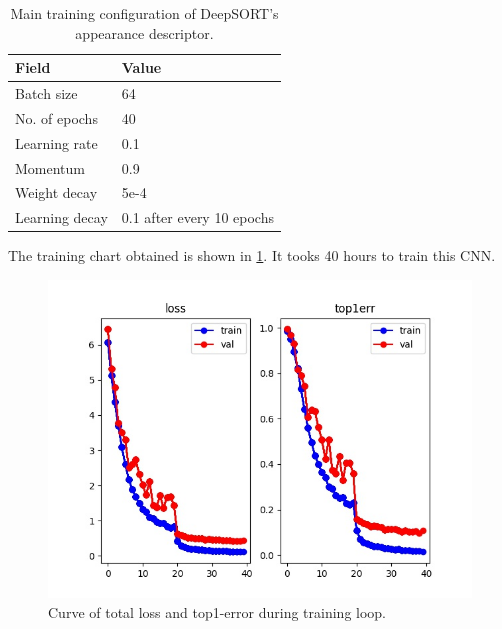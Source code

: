 \begin{table}
\centering
	\label{tab:des}
	\begin{tabular}{|l|l|}
		
		\hline 
		Field & Value\\ 
		\hline 
		Batch size & 64 \\
		\hline
		No. of epochs & 40 \\
		\hline
		Learning rate & 0.1 \\
		\hline
		Momentum & 0.9 \\
		\hline
		Weight decay & 5e-4\\ 
		\hline
		Learning decay & 0.1 after every 10 epochs\\
		\hline
	\end{tabular} 
\caption{Main training configuration of DeepSORT’s appearance descriptor.}
\end{table}
The training chart obtained is shown in \ref{fig:descriptor}. It tooks 40 hours to train this CNN.
\begin{figure}[htbp]
	\centerline{\includegraphics[width=0.5\linewidth]{Figs/descriptor.jpg}}
	\caption{Curve of total loss and top1-error during training loop.}
	\label{fig:descriptor}
\end{figure}
